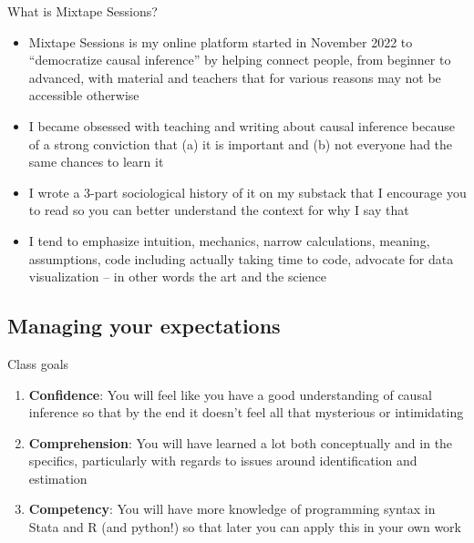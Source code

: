 \documentclass{beamer}
\begin{document}
\begin{frame}{What is Mixtape Sessions?}

  \begin{itemize}
    \item Mixtape Sessions is my online platform started in November 2022 to ``democratize causal inference'' by helping connect people, from beginner to advanced, with material and teachers that for various reasons may not be accessible otherwise
    \item I became obsessed with teaching and writing about causal inference because of a strong conviction that (a) it is important and (b) not everyone had the same chances to learn it
    \item I wrote a 3-part sociological history of it on my substack that I encourage you to read so you can better understand the context for why I say that
    \item I tend to emphasize intuition, mechanics, narrow calculations, meaning, assumptions, code including actually taking time to code, advocate for data visualization -- in other words the art and the science
  \end{itemize}

\end{frame}

\subsection{Managing your expectations}

\begin{frame}{Class goals}

  \begin{enumerate}
    \item \textbf{Confidence}: You will feel like you have a good understanding of causal inference so that by the end it doesn't feel all that mysterious or intimidating
    \item \textbf{Comprehension}: You will have learned a lot both conceptually and in the specifics, particularly with regards to issues around identification and estimation
    \item \textbf{Competency}: You will have more knowledge of programming syntax in Stata and R (and python!) so that later you can apply this in your own work
  \end{enumerate}

\end{frame}
\end{document}
